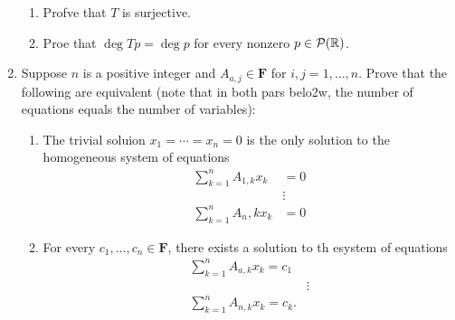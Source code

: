 \documentclass[10pt,a4paper]{report}
\newcommand{\F}{\textbf{F}}
\begin{document}
\begin{enumerate}
\begin{enumerate}
	\item Profve that $T$ is surjective.
	\item Proe that $\deg Tp = \deg p$ for every nonzero $p \in \mathcal{P}(\mathbb{R})$.
\end{enumerate}

\item Suppose $n$ is a positive integer and $A_{a,j} \in \F$ for $i,j = 1,\dots,n$.  Prove that the following are equivalent (note that in both pars belo2w, the number of equations equals the number of variables):

\begin{enumerate}
\item The trivial soluion $x_1=\cdots=x_n=0$ is the only solution to the homogeneous system of equations
\begin{align*}
	\sum_{k=1}^n A_{1,k} x_k &= 0\\
	&\vdots \\
	\sum_{k=1}^n A_n,k x_k &= 0
\end{align*}

\item For every $c_1,\dots,c_n \in \F$, there exists a solution to th esystem of equations 
\begin{align*}
	\sum_{k=1}^n A_{a,k} x_k = c_1 \\
	&\vdots \\
	\sum_{k=1}^n A_{n,k} x_k = c_k.
\end{align*}
\end{enumerate}

\end{enumerate}
\end{document}
